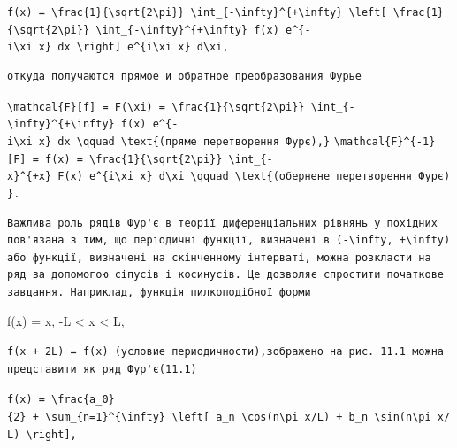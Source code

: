 \documentclass[
  ukrainian,
]{article}
\begin{document}
\texttt{f(x)\ =\ \textbackslash{}frac\{1\}\{\textbackslash{}sqrt\{2\textbackslash{}pi\}\}\ \textbackslash{}int\_\{-\textbackslash{}infty\}\^{}\{+\textbackslash{}infty\}\ \textbackslash{}left{[}\ \textbackslash{}frac\{1\}\{\textbackslash{}sqrt\{2\textbackslash{}pi\}\}\ \textbackslash{}int\_\{-\textbackslash{}infty\}\^{}\{+\textbackslash{}infty\}\ f(x)\ e\^{}\{-i\textbackslash{}xi\ x\}\ dx\ \textbackslash{}right{]}\ e\^{}\{i\textbackslash{}xi\ x\}\ d\textbackslash{}xi,}

\begin{verbatim}
откуда получаются прямое и обратное преобразования Фурье
\end{verbatim}

\texttt{\textbackslash{}mathcal\{F\}{[}f{]}\ =\ F(\textbackslash{}xi)\ =\ \textbackslash{}frac\{1\}\{\textbackslash{}sqrt\{2\textbackslash{}pi\}\}\ \textbackslash{}int\_\{-\textbackslash{}infty\}\^{}\{+\textbackslash{}infty\}\ f(x)\ e\^{}\{-i\textbackslash{}xi\ x\}\ dx\ \textbackslash{}qquad\ \textbackslash{}text\{(пряме\ перетворення\ Фур\textquotesingle{}є),\}}
\texttt{\textbackslash{}mathcal\{F\}\^{}\{-1\}{[}F{]}\ =\ f(x)\ =\ \textbackslash{}frac\{1\}\{\textbackslash{}sqrt\{2\textbackslash{}pi\}\}\ \textbackslash{}int\_\{-x\}\^{}\{+x\}\ F(x)\ e\^{}\{i\textbackslash{}xi\ x\}\ d\textbackslash{}xi\ \textbackslash{}qquad\ \textbackslash{}text\{(обернене\ перетворення\ Фур\textquotesingle{}є)\}.}

\begin{verbatim}
Важлива роль рядів Фур'є в теорії диференціальних рівнянь у похідних пов'язана з тим, що періодичні функції, визначені в (-\infty, +\infty) або функції, визначені на скінченному інтерваті, можна розкласти на ряд за допомогою сіпусів і косинусів. Це дозволяє спростити початкове завдання. Наприклад, функція пилкоподібної форми
\end{verbatim}

f(x) = x, -L \textless{} x \textless{} L,

\begin{verbatim}
f(x + 2L) = f(x) (условие периодичности),зображено на рис. 11.1 можна представити як ряд Фур'є(11.1)
\end{verbatim}

\texttt{f(x)\ =\ \textbackslash{}frac\{a\_0\}\{2\}\ +\ \textbackslash{}sum\_\{n=1\}\^{}\{\textbackslash{}infty\}\ \textbackslash{}left{[}\ a\_n\ \textbackslash{}cos(n\textbackslash{}pi\ x/L)\ +\ b\_n\ \textbackslash{}sin(n\textbackslash{}pi\ x/L)\ \textbackslash{}right{]},}
\end{document}
